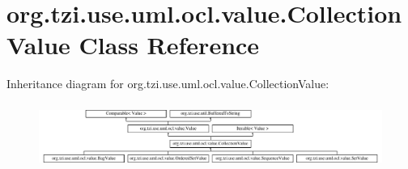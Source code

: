 \hypertarget{classorg_1_1tzi_1_1use_1_1uml_1_1ocl_1_1value_1_1_collection_value}{\section{org.\-tzi.\-use.\-uml.\-ocl.\-value.\-Collection\-Value Class Reference}
\label{classorg_1_1tzi_1_1use_1_1uml_1_1ocl_1_1value_1_1_collection_value}
}
Inheritance diagram for org.\-tzi.\-use.\-uml.\-ocl.\-value.\-Collection\-Value\-:\begin{figure}[H]
\begin{center}
\leavevmode
\includegraphics[height=2.145594cm]{classorg_1_1tzi_1_1use_1_1uml_1_1ocl_1_1value_1_1_collection_value}
\end{center}
\end{figure}
